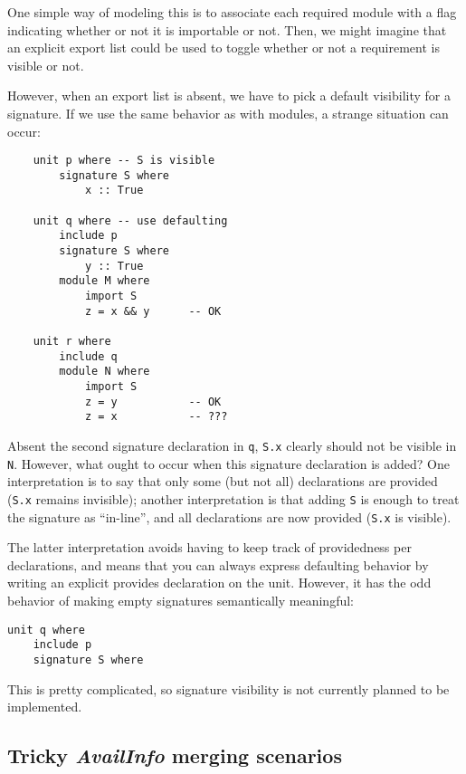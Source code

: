 \documentclass{article}
\begin{document}
One simple way of modeling this is to associate each required module
with a flag indicating whether or not it is importable or not.  Then, we
might imagine that an explicit export list could be used to toggle
whether or not a requirement is visible or not.

However, when an export list is absent, we have to pick a default
visibility for a signature.  If we use the same behavior as with
modules, a strange situation can occur:

\begin{verbatim}
    unit p where -- S is visible
        signature S where
            x :: True

    unit q where -- use defaulting
        include p
        signature S where
            y :: True
        module M where
            import S
            z = x && y      -- OK

    unit r where
        include q
        module N where
            import S
            z = y           -- OK
            z = x           -- ???
\end{verbatim}
%
Absent the second signature declaration in \verb|q|, \verb|S.x| clearly
should not be visible in \verb|N|.  However, what ought to occur when this signature
declaration is added?  One interpretation is to say that only some
(but not all) declarations are provided (\verb|S.x| remains invisible);
another interpretation is that adding \verb|S| is enough to treat
the signature as ``in-line'', and all declarations are now provided
(\verb|S.x| is visible).

The latter interpretation avoids having to keep track of providedness
per declarations, and means that you can always express defaulting
behavior by writing an explicit provides declaration on the unit.
However, it has the odd behavior of making empty signatures semantically
meaningful:

\begin{verbatim}
unit q where
    include p
    signature S where
\end{verbatim}
%

This is pretty complicated, so signature visibility is not currently
planned to be implemented.

\subsection{Tricky \textit{AvailInfo} merging scenarios}
\end{document}
